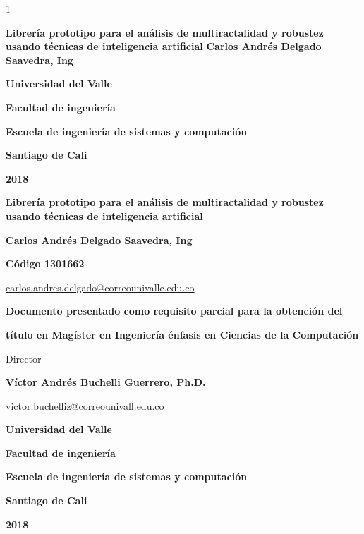 1\begin{titlepage}
		\begin{center}
			{\bf Librería prototipo para el análisis de multiractalidad y robustez usando técnicas de inteligencia artificial}
			\vfill
			{\bf Carlos Andrés Delgado Saavedra, Ing}
			\vfill
			{\bf Universidad del Valle  \par}
			{\bf Facultad de ingeniería \par}
			{\bf Escuela de ingeniería de sistemas y computación \par}
			{\bf Santiago de Cali \par}
			{\bf 2018 \par}
		\end{center}
\end{titlepage}


\begin{titlepage}
	\begin{center}
		{\bf Librería prototipo para el análisis de multiractalidad y robustez usando técnicas de inteligencia artificial}
		\vfill
		{\bf Carlos Andrés Delgado Saavedra, Ing \par}
		{\bf Código 1301662 \par}
		{\url{carlos.andres.delgado@correounivalle.edu.co} \par}
		\vfill
		{\bf Documento presentado como requisito parcial para la obtención del \par}
		{\bf título en Magíster en Ingeniería énfasis en Ciencias de la Computación \par}
		\vfill

		{Director \par}
		{\bf Víctor Andrés Buchelli Guerrero, Ph.D. \par}
		{\url{victor.buchelliz@correounivall.edu.co} \par}
		\vfill
		{\bf Universidad del Valle  \par}
		{\bf Facultad de ingeniería \par}
		{\bf Escuela de ingeniería de sistemas y computación \par}
		{\bf Santiago de Cali \par}
		{\bf 2018 \par}
	\end{center}
\end{titlepage}
